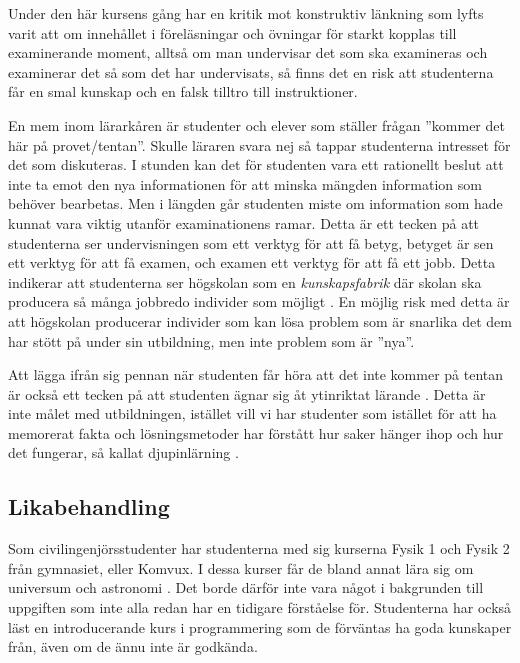 \documentclass[a4paper, 10pt]{article}
\begin{document}
Under den här kursens gång har en kritik mot 
konstruktiv länkning som lyfts varit att om 
innehållet i föreläsningar och övningar för 
starkt kopplas till examinerande moment, 
alltså om man undervisar det som ska examineras 
och examinerar det så som det har undervisats,
så finns det en risk att studenterna får en 
smal kunskap och en falsk tilltro till 
instruktioner.

En mem inom lärarkåren är studenter och elever 
som ställer frågan ''kommer det här på 
provet/tentan''. Skulle läraren svara nej så 
tappar studenterna intresset för det som 
diskuteras. I stunden kan det för studenten vara 
ett rationellt beslut att inte ta emot den 
nya informationen för att minska mängden 
information som behöver bearbetas. Men i längden 
går studenten miste om information som hade 
kunnat vara viktig utanför examinationens ramar. 
Detta är ett tecken på att studenterna ser 
undervisningen som ett verktyg för att få betyg,
betyget är sen ett verktyg för att få examen,
och examen ett verktyg för att få ett jobb. 
Detta indikerar att studenterna ser 
högskolan som en \textit{kunskapsfabrik} där 
skolan ska producera så många jobbredo individer 
som möjligt \parencite[sida 274]{branden2022}.
En möjlig risk med detta är att högskolan 
producerar individer som kan lösa problem som 
är snarlika det dem har stött på under sin 
utbildning, men inte problem som är ''nya''.

Att lägga ifrån sig pennan när studenten får 
höra att det inte kommer på tentan är också ett 
tecken på att studenten ägnar sig åt 
ytinriktat lärande 
\parencite[sida 22]{elmgrenolding2025}. Detta 
är inte målet med utbildningen, istället vill 
vi har studenter som istället för att ha 
memorerat fakta och lösningsmetoder har 
förstått hur saker hänger ihop och hur det 
fungerar, så kallat djupinlärning 
\parencite[sida 22]{elmgrenolding2025}.
 
\subsection{Likabehandling}

Som civilingenjörsstudenter har studenterna med 
sig kurserna Fysik 1 och Fysik 2 från gymnasiet,
eller Komvux. I dessa kurser får de bland annat 
lära sig om universum och astronomi 
\parencite{kursplanfysik2011}. Det borde därför 
inte vara något i bakgrunden till uppgiften som 
inte alla redan har en tidigare förståelse för.
Studenterna har också läst en introducerande 
kurs i programmering som de förväntas ha goda 
kunskaper från, även om de ännu inte är 
godkända. 
\end{document}
